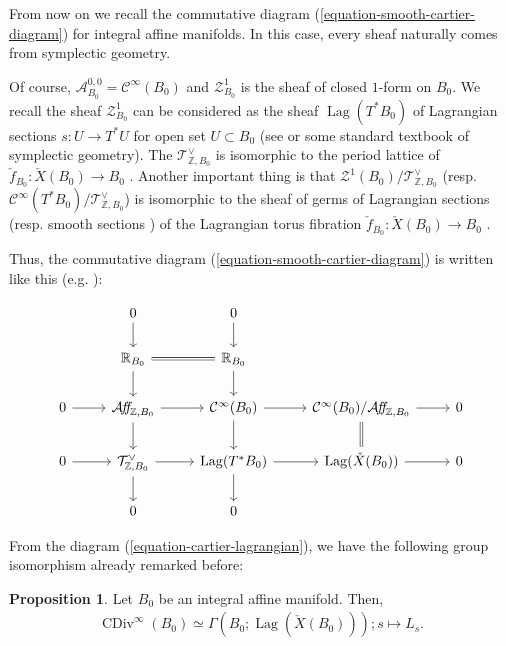 \documentclass[a4paper,dvipdfmx,reqno,12pt]{amsart}
\theoremstyle{definition}
\newtheorem{proposition}[theorem]{Proposition}
\newcommand{\Z}{\mathbb{Z}}%
\newcommand{\mb}[1]{\mathbb{#1}}%
\newcommand{\mcal}[1]{\mathcal{#1}}%
\newcommand{\opn}[1]{\operatorname{#1}}
\newcommand{\AffS}{{\mathop{\mcal{A}\!f\!\!f\!}\nolimits}}
\numberwithin{equation}{section}
\begin{document}
From now on we recall the commutative diagram (\ref{equation-smooth-cartier-diagram})
 for integral affine manifolds.
In this case, every sheaf naturally comes 
from symplectic geometry.

Of course, 
$\mcal{A}_{B_0}^{0,0}=\mcal{C}^{\infty}(B_0)$ and
$\mcal{Z}^{1}_{B_0}$ is the sheaf of 
closed $1$-form on $B_0$.
We recall the sheaf $\mcal{Z}^{1}_{B_0}$ can be 
considered as the sheaf 
$\opn{Lag}(T^{*}B_0)$ of Lagrangian sections 
$s:U \to T^{*}U$ for open set $U \subset B_0$ 
(see \cite[3.2]{MR1853077} or some standard textbook
of symplectic geometry).
The $\mcal{T}_{\Z,B_0}^{\vee}$ is isomorphic to
the period lattice of 
$\check{f}_{B_0}\colon \check{X}(B_0)\to B_0$ 
 \cite{duistermaatGlobalActionangleCoordinates1980a}.
Another important thing is that 
$\mcal{Z}^{1}(B_0)/\mcal{T}_{\Z,B_0}^{\vee}$
 (resp. $\mcal{C}^{\infty}(T^{*}B_0)/\mcal{T}_{\Z,B_0}^{\vee}$) 
is isomorphic to the sheaf of germs of Lagrangian sections 
(resp. smooth sections ) of the Lagrangian torus fibration 
$\check{f}_{B_0}\colon \check{X}(B_0)\to B_0$ 
\cite[(2.7), (2.11)]{duistermaatGlobalActionangleCoordinates1980a}.


Thus, the commutative diagram (\ref{equation-smooth-cartier-diagram}) is written like this 
(e.g. \cite[p.468]{MR2567952}):

\begin{equation} \label{equation-cartier-lagrangian}
  \begin{tikzcd}
    & 0 \arrow[d]    & 0 \arrow[d]           &                      &   \\
    & \mb{R}_{B_0} \arrow[r,equal] \arrow[d]                & \mb{R}_{B_0} \arrow[d]           &                      &   \\
    0 \arrow[r] & \AffS_{\Z,B_0} \arrow[r] \arrow[d]         & \mcal{C}^{\infty}(B_0) \arrow[r] \arrow[d] & \mcal{C}^{\infty}(B_0)/\AffS_{\Z,B_0}  \arrow[r] \arrow[d,equal] & 0 \\
    0 \arrow[r] & \mcal{T}_{\Z,B_0}^{\vee} \arrow[r] \arrow[d] & \opn{Lag}(T^{*}B_0) \arrow[r] \arrow[d]  & \opn{Lag}(\check{X}(B_0)) \arrow[r]   & 0 \\
    & 0 & 0 &  &
  \end{tikzcd}
\end{equation}



From the diagram (\ref{equation-cartier-lagrangian}),
we have the following group isomorphism already remarked 
before:

\begin{proposition}
\label{proposition-cartier-lagrangian}
Let $B_0$ be an integral affine manifold. Then,
\begin{align}
\opn{CDiv}^{\infty}(B_0)\simeq \Gamma(B_0;
\opn{Lag}(\check{X}(B_0)));s\mapsto L_s.
\end{align}
\end{proposition}
\end{document}
